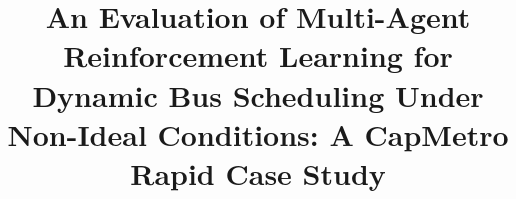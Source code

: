 \documentclass[a4paper, twoside]{report}
\title{An Evaluation of Multi-Agent Reinforcement Learning for Dynamic Bus Scheduling Under Non-Ideal Conditions: A CapMetro Rapid Case Study}
\begin{document}
\onehalfspacing

\end{document}
